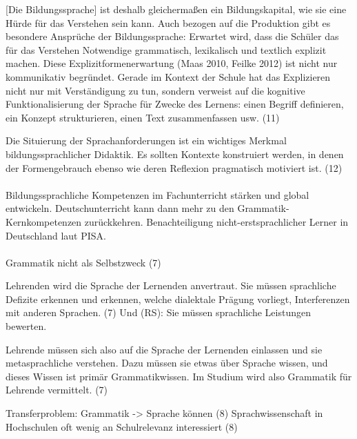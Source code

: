 [Die Bildungssprache] ist deshalb gleichermaßen ein Bildungskapital, wie sie eine Hürde für das Verstehen sein kann. Auch bezogen auf die Produktion gibt es besondere Ansprüche der Bildungssprache: Erwartet wird, dass die Schüler das für das Verstehen Notwendige grammatisch, lexikalisch und textlich explizit machen. Diese Explizitformenerwartung (Maas 2010, Feilke 2012) ist nicht nur kommunikativ begründet. Gerade im Kontext der Schule hat das Explizieren nicht nur mit Verständigung zu tun, sondern verweist auf die kognitive Funktionalisierung der Sprache für Zwecke des Lernens: einen Begriff definieren, ein Konzept strukturieren, einen Text zusammenfassen usw. (11)

Die Situierung der Sprachanforderungen ist ein wichtiges Merkmal bildungssprachlicher Didaktik. Es sollten Kontexte konstruiert werden, in denen der Formengebrauch ebenso wie deren Reflexion pragmatisch motiviert ist. (12)

\paragraph*{\citet{Schroeterbrauss2013}}

Bildungssprachliche Kompetenzen im Fachunterricht stärken und global entwickeln.
Deutschunterricht kann dann mehr zu den Grammatik-Kernkompetenzen zurückkehren.
Benachteiligung nicht-erstsprachlicher Lerner in Deutschland laut PISA.

\paragraph*{\citet{Eisenberg2013c}}

Grammatik nicht als Selbstzweck (7)

Lehrenden wird die Sprache der Lernenden anvertraut.
Sie müssen sprachliche Defizite erkennen und erkennen, welche dialektale Prägung vorliegt, Interferenzen mit anderen Sprachen. (7) Und (RS): Sie müssen sprachliche Leistungen bewerten.

Lehrende müssen sich also auf die Sprache der Lernenden einlassen und sie metasprachliche verstehen.
Dazu müssen sie etwas über Sprache wissen, und dieses Wissen ist primär Grammatikwissen.
Im Studium wird also Grammatik für Lehrende vermittelt. (7)

Transferproblem: Grammatik -> Sprache können (8)
Sprachwissenschaft in Hochschulen oft wenig an Schulrelevanz interessiert (8)

